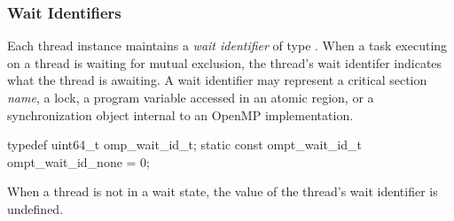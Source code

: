 \subsubsection{Wait Identifiers}

\label{sec:omp_wait_id_t} 

Each thread instance maintains a \emph{wait identifier} of type .
When a task executing on a thread is waiting for mutual exclusion, the thread's wait identifer indicates what the thread is awaiting.
A wait identifier may represent a critical section {\em name}, a lock, a program variable accessed in an atomic region, or a synchronization object internal to an OpenMP implementation.


\begin{ccppspecific}
\begin{omptOther}
typedef uint64_t omp_wait_id_t;
static const ompt_wait_id_t ompt_wait_id_none = 0;
\end{omptOther}
\end{ccppspecific}


When a thread is not in a wait state, the value of the thread's wait identifier is undefined.

